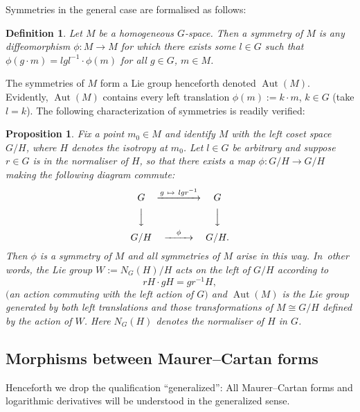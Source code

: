 \documentclass[11pt]{article}
\numberwithin{equation}{section}
\numberwithin{equation}{section}
\newtheorem{Proposition}[Theorem]{Proposition}
\newtheorem{Definition}[Theorem]{Definition}
\DeclareMathOperator{\automorphism}{Aut}
\begin{document}
Symmetries in the general case are formalised as follows:
\begin{Definition}\label{symmetriesD}
 Let $M$ be a homogeneous $G$-space. Then a {\it symmetry} of $M$ is
 any diffeomorphism $\phi \colon M \rightarrow M$ for which there
 exists some $l \in G$ such that
 $\phi(g \cdot m) = lgl^{-1} \cdot \phi(m)$ for all
 $g \in G$, $m \in M$.
\end{Definition}

 The symmetries of $M$ form a Lie group henceforth denoted
$\automorphism(M)$. Evidently, $\automorphism(M)$ contains every left
translation $\phi(m):=k \cdot m$, $k \in G$ (take $l=k$). The
following characterization of symmetries is readily verified:

\begin{Proposition}\label{symmetriesP}
 Fix a point $m_0 \in M$ and identify $M$ with the left coset space
 $G/H$, where $H$ denotes the isotropy at $m_0$. Let $l \in G$ be
 arbitrary and suppose $r \in G$ is in the normaliser of $H$, so that
 there exists a map $\phi \colon G/H \rightarrow G/H$ making the
 following diagram commute:
 \begin{equation*}
 \begin{CD} G @>{g~\mapsto~lgr^{-1}}>> G \\ @VVV @VVV \\ G/H
@>{\phi}>> G/H.
 \end{CD}
 \end{equation*}
 Then $\phi $ is a symmetry of $M$ and all
symmetries of $M$ arise in this way. In~other words, the Lie group
$W:=N_G(H)/H$ acts on the left of $G/H$ according to
\[
rH \cdot gH = gr^{-1}H,
\]
$($an action commuting with the left action of $G)$ and
$\automorphism(M)$ is the Lie group generated by both left
translations and those transformations of $M \cong G/H$ defined by the
action of $W$. Here $N_G(H)$ denotes the normaliser of $H $ in $G$.
\end{Proposition}

\setcounter{Theorem}{3}
\subsection*{Morphisms between Maurer--Cartan forms}

Henceforth we drop the qualification ``generalized'': All Maurer--Cartan
forms and logarithmic derivatives will be understood in the
generalized sense.
\end{document}
